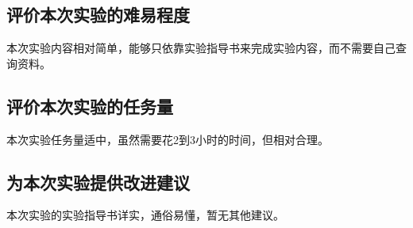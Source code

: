 \documentclass[UTF8]{article}
\begin{document}
	\subsection{评价本次实验的难易程度}
	本次实验内容相对简单，能够只依靠实验指导书来完成实验内容，而不需要自己查询资料。\par
	
	\subsection{评价本次实验的任务量}
	本次实验任务量适中，虽然需要花2到3小时的时间，但相对合理。\par
	
	\subsection{为本次实验提供改进建议}
	本次实验的实验指导书详实，通俗易懂，暂无其他建议。
	
\end{document}
